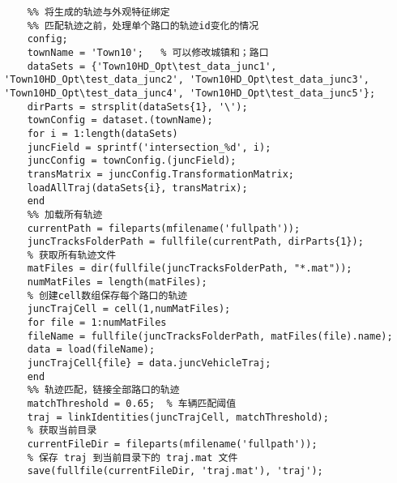 \begin{lstlisting}
	%% 将生成的轨迹与外观特征绑定
	%% 匹配轨迹之前，处理单个路口的轨迹id变化的情况
	config;
	townName = 'Town10';   % 可以修改城镇和；路口
	dataSets = {'Town10HD_Opt\test_data_junc1', 'Town10HD_Opt\test_data_junc2', 'Town10HD_Opt\test_data_junc3', 'Town10HD_Opt\test_data_junc4', 'Town10HD_Opt\test_data_junc5'};
	dirParts = strsplit(dataSets{1}, '\');
	townConfig = dataset.(townName);
	for i = 1:length(dataSets)
	juncField = sprintf('intersection_%d', i);
	juncConfig = townConfig.(juncField);
	transMatrix = juncConfig.TransformationMatrix;
	loadAllTraj(dataSets{i}, transMatrix);
	end
	%% 加载所有轨迹
	currentPath = fileparts(mfilename('fullpath'));
	juncTracksFolderPath = fullfile(currentPath, dirParts{1});
	% 获取所有轨迹文件
	matFiles = dir(fullfile(juncTracksFolderPath, "*.mat"));
	numMatFiles = length(matFiles);
	% 创建cell数组保存每个路口的轨迹
	juncTrajCell = cell(1,numMatFiles);
	for file = 1:numMatFiles
	fileName = fullfile(juncTracksFolderPath, matFiles(file).name);
	data = load(fileName);
	juncTrajCell{file} = data.juncVehicleTraj;
	end
	%% 轨迹匹配，链接全部路口的轨迹
	matchThreshold = 0.65;  % 车辆匹配阈值
	traj = linkIdentities(juncTrajCell, matchThreshold);
	% 获取当前目录
	currentFileDir = fileparts(mfilename('fullpath')); 
	% 保存 traj 到当前目录下的 traj.mat 文件
	save(fullfile(currentFileDir, 'traj.mat'), 'traj');
\end{lstlisting}



